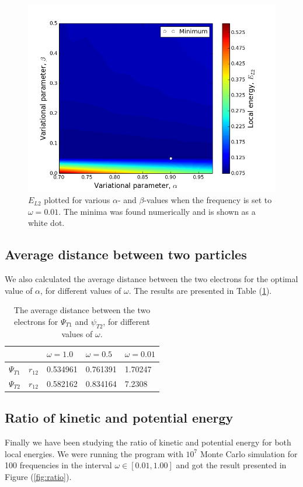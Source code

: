 \documentclass[norsk,a4paper,12pt]{article}
\begin{document}
\begin{figure} [H]
    \centering
    \includegraphics[width=12cm]{E_L2_contour_omega=0_01.png}
    \caption{$E_{L2}$ plotted for various $\alpha$- and $\beta$-values when the frequency is set to $\omega=0.01$. The minima was found numerically and is shown as a white dot.}
    \label{fig:E_L2_omega=0_01}
\end{figure}

\subsection{Average distance between two particles}
We also calculated the average distance between the two electrons for the optimal value of $\alpha$, for different values of $\omega$. The results are presented in Table (\ref{tab:average_r12}).

\begin{table} [H]
\centering
\caption{The average distance between the two electrons for $\Psi_{T1}$ and $\psi_{T2}$, for different values of $\omega$.}

\begin{tabularx}{\textwidth}{XXXX} \hline
\label{tab:average_r12}
{\bf } & {\bf $\omega = 1.0$ } & {\bf $ \omega = 0.5 $ } & {\bf $\omega = 0.01$} \\ \hline
{$\Psi_{T1} \quad r_{12}$} & 0.534961 & 0.761391 & 1.70247\\ \hline 
{$\Psi_{T2} \quad r_{12}$} & 0.582162 & 0.834164 & 7.2308\\ \hline 
\end{tabularx}
\end{table}

\subsection{Ratio of kinetic and potential energy}
Finally we have been studying the ratio of kinetic and potential energy for both local energies. We were running the program with $10^7$ Monte Carlo simulation for 100 frequencies in the interval $\omega\in[0.01,1.00]$ and got the result presented in Figure (\ref{fig:ratio}).
\end{document}
